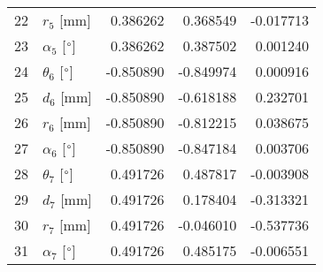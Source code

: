 \documentclass{standalone}%
\begin{document}
\begin{tabular}{llrrr}
22 &              $r_{5}$ [mm] &  0.386262 &   0.368549 &  -0.017713 \\
23 &  $\alpha_{5}$ [$\degree$] &  0.386262 &   0.387502 &   0.001240 \\
24 &  $\theta_{6}$ [$\degree$] & -0.850890 &  -0.849974 &   0.000916 \\
25 &              $d_{6}$ [mm] & -0.850890 &  -0.618188 &   0.232701 \\
26 &              $r_{6}$ [mm] & -0.850890 &  -0.812215 &   0.038675 \\
27 &  $\alpha_{6}$ [$\degree$] & -0.850890 &  -0.847184 &   0.003706 \\
28 &  $\theta_{7}$ [$\degree$] &  0.491726 &   0.487817 &  -0.003908 \\
29 &              $d_{7}$ [mm] &  0.491726 &   0.178404 &  -0.313321 \\
30 &              $r_{7}$ [mm] &  0.491726 &  -0.046010 &  -0.537736 \\
31 &  $\alpha_{7}$ [$\degree$] &  0.491726 &   0.485175 &  -0.006551 \\
\bottomrule
\end{tabular}
%
\end{document}
